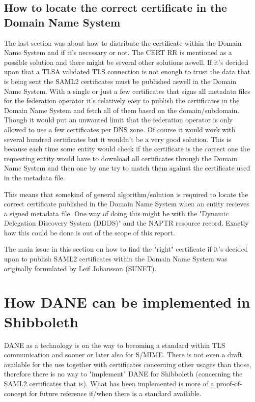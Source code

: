 \subsection{How to locate the correct certificate in the Domain Name System}
\label{subsec:matching-dilemma}
The last section was about how to distribute the certificate within the Domain Name System and if it's necessary or not.
The CERT RR is mentioned as a possible solution and there might be several other solutions aswell.
If it's decided upon that a TLSA validated TLS connection is not enough to trust the data that is being sent the SAML2 certificates must be published aswell in the Domain Name System.
With a single or just a few certificates that signs all metadata files for the federation operator it's relatively easy to publish the certificates in the Domain Name System and fetch all of them based on the domain/subdomain.
Though it would put an unwanted limit that the federation operator is only allowed to use a few certificates per DNS zone.
Of course it would work with several hundred certificates but it wouldn't be a very good solution.
This is because each time some entity would check if the certificate is the correct one the requesting entity would have to download all certificates through the Domain Name System and then one by one try to match them against the certificate used in the metadata file.

This means that somekind of general algorithm/solution is required to locate the correct certificate published in the Domain Name System when an entity recieves a signed metadata file.
One way of doing this might be with the "Dynamic Delegation Discovery System (DDDS)"\cite{rfc:3401,rfc:3402,rfc:3403,rfc:3404} and the NAPTR resource record\cite{rfc:3403}.
Exactly how this could be done is out of the scope of this report.

The main issue in this section on how to find the "right" certificate if it's decided upon to publish SAML2 certificates within the Domain Name System was originally formulated by Leif Johansson (SUNET).

\section{How DANE can be implemented in Shibboleth} 
DANE as a technology is on the way to becoming a standard within TLS communication and sooner or later also for S/MIME.
There is not even a draft available for the use together with certificates concerning other usages than those, therefore there is no way to "implement" DANE for Shibboleth (concerning the SAML2 certificates that is).
What has been implemented is more of a proof-of-concept for future reference if/when there is a standard available.

